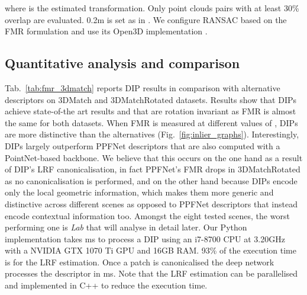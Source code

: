 \documentclass[a4paper,conference]{IEEEtran}
\begin{document}
where  is the estimated transformation. 
Only point clouds pairs with at least 30\% overlap are evaluated.
0.2m is set as in \cite{Zeng2017,Choy2019,Bai2020}.
We configure RANSAC based on the FMR formulation and use its Open3D implementation \cite{Zhou2018}.








\subsection{Quantitative analysis and comparison}

Tab.~\ref{tab:fmr_3dmatch} reports DIP results in comparison with alternative descriptors on 3DMatch and 3DMatchRotated datasets.
Results show that DIPs achieve state-of-the art results and that are rotation invariant as FMR is almost the same for both datasets.
When FMR is measured at different values of , DIPs are more distinctive than the alternatives (Fig.~\ref{fig:inlier_graphs}).
Interestingly, DIPs largely outperform PPFNet descriptors that are also computed with a PointNet-based backbone.
We believe that this occurs on the one hand as a result of DIP's LRF canonicalisation, in fact PPFNet's FMR drops in 3DMatchRotated as no canonicalisation is performed, and on the other hand because DIPs encode only the local geometric information, which makes them more generic and distinctive across different scenes as opposed to PPFNet descriptors that instead encode contextual information too.
Amongst the eight tested scenes, the worst performing one is \emph{Lab} that will analyse in detail later.
Our Python implementation takes ms to process a DIP using an i7-8700 CPU at 3.20GHz with a NVIDIA GTX 1070 Ti GPU and 16GB RAM. 
93\% of the execution time is for the LRF estimation.
Once a patch is canonicalised the deep network processes the descriptor in ms.
Note that the LRF estimation can be parallelised and implemented in C++ to reduce the execution time.
\end{document}
